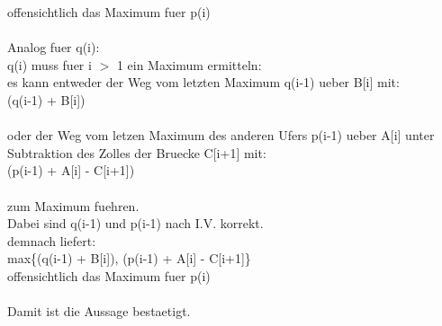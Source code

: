 \documentclass{article}
\begin{document}
offensichtlich das Maximum fuer p(i)\\
\\
Analog fuer q(i):\\
q(i) muss fuer i $>$ 1 ein Maximum ermitteln:\\
es kann entweder der Weg vom letzten Maximum q(i-1) ueber
B[i] mit:\\
(q(i-1) + B[i])\\
\\
oder der Weg vom letzen Maximum des anderen Ufers p(i-1) ueber
A[i] unter Subtraktion des Zolles der Bruecke C[i+1] mit:\\
(p(i-1) + A[i] - C[i+1])\\
\\
zum Maximum fuehren.\\
Dabei sind q(i-1) und p(i-1) nach I.V. korrekt.\\
demnach liefert:\\
max\{(q(i-1) + B[i]), (p(i-1) + A[i] - C[i+1]\}\\
offensichtlich das Maximum fuer p(i)\\
\\
Damit ist die Aussage bestaetigt.
\end{document}
